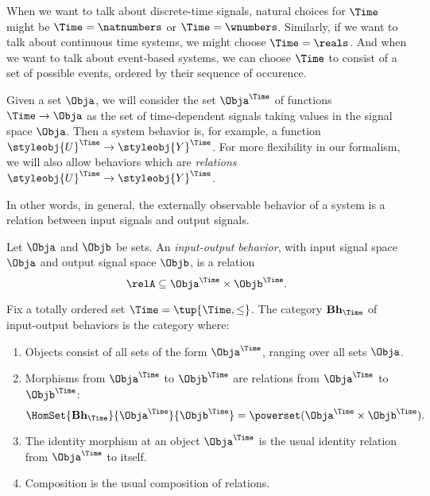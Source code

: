 When we want to talk about discrete-time signals, natural choices for $\Time$ might be $\Time = \natnumbers$ or $\Time = \wnumbers$. Similarly, if we want to talk about continuous time systems, we might choose $\Time = \reals$.
And when we want to talk about event-based systems, we can choose $\Time$ to consist of a set of possible events, ordered by their sequence of occurence.


Given a set $\Obja$, we will consider the set $\Obja^\Time$ of functions $\Time \to \Obja$ as the set of time-dependent signals taking values in the signal space $\Obja$. Then a system behavior is, for example, a function $\styleobj{U}^\Time \to \styleobj{Y}^\Time$. For more flexibility in our formalism, we will also allow behaviors which are \emph{relations} $\styleobj{U}^\Time \to \styleobj{Y}^\Time$. 

In other words, in general, the externally observable behavior of a system is a relation between input signals and output signals.

\begin{definition}
    Let $\Obja$ and $\Objb$ be sets.
    An \emph{input-output behavior}, with input signal space $\Obja$ and output signal space $\Objb$, is a relation
    \begin{equation}
        \relA \subseteq \Obja^\Time \times \Objb^\Time.
    \end{equation}
\end{definition}

\begin{definition}
    Fix a totally ordered set $\Time = \tup{\Time, \leq}$.
    The category $\textbf{Bh}_\Time$ of input-output behaviors is the category where:
    \begin{enumerate}
        \item Objects consist of all sets of the form $\Obja^\Time$, ranging over all sets $\Obja$.
        \item Morphisms from $\Obja^\Time$ to $\Objb^\Time$ are relations from $\Obja^\Time$ to $\Objb^\Time$:
              \begin{equation}
                  \HomSet{\textbf{Bh}_\Time}{\Obja^\Time}{\Objb^\Time} = \powerset (\Obja^\Time \times \Objb^\Time).
              \end{equation}
        \item The identity morphism at an object $\Obja^\Time$ is the usual identity relation from $\Obja^\Time$ to itself.
        \item Composition is the usual composition of relations.
    \end{enumerate}
\end{definition}

